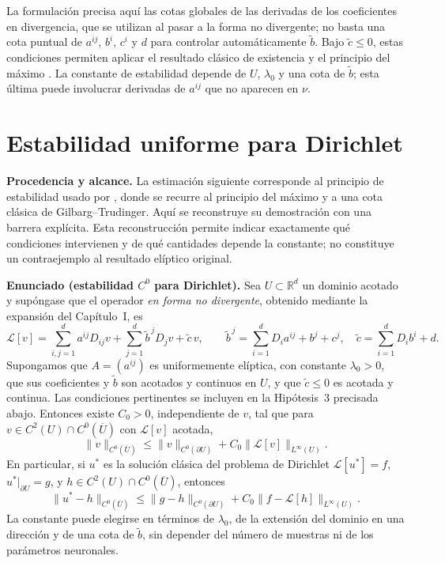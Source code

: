 \medskip
\noindent
La formulación precisa aquí las cotas globales de las derivadas de los
coeficientes en divergencia, que se utilizan al pasar a la forma no
divergente; no basta una cota puntual de $a^{ij}$, $b^i$, $c^i$ y $d$
para controlar automáticamente $\widetilde b$. Bajo $\widetilde c\le0$,
estas condiciones permiten aplicar el resultado clásico de existencia y
el principio del máximo \cite{gilbarg2001elliptic}. La constante de
estabilidad depende de $U$, $\lambda_0$ y una cota de $\widetilde b$;
esta última puede involucrar derivadas de $a^{ij}$ que no aparecen en $\nu$.

\section{Estabilidad uniforme para Dirichlet}
\label{sec:estabilidad_dirichlet}

\noindent\textbf{Procedencia y alcance.}
La estimación siguiente corresponde al principio de estabilidad usado por
\cite[Apéndice~D, Lema~D.1]{shin2020convergence}, donde se recurre al
principio del máximo y a una cota clásica de Gilbarg--Trudinger.
Aquí se reconstruye su demostración con una barrera explícita. Esta
reconstrucción permite indicar exactamente qué condiciones intervienen y de
qué cantidades depende la constante; no constituye un contraejemplo al
resultado elíptico original.

\medskip
\noindent\textbf{Enunciado (estabilidad $C^0$ para Dirichlet).}
Sea $U\subset\mathbb R^d$ un dominio acotado y supóngase que el operador
\emph{en forma no divergente}, obtenido mediante la expansión del Capítulo~I,
es
\[
\mathcal L[v]=\sum_{i,j=1}^d a^{ij}D_{ij}v+
\sum_{j=1}^d\widetilde b^{\,j}D_jv+\widetilde c\,v,
\qquad
\widetilde b^{\,j}=\sum_{i=1}^dD_i a^{ij}+b^j+c^j,
\quad
\widetilde c=\sum_{i=1}^dD_i b^i+d.
\]
Supongamos que $A=(a^{ij})$ es uniformemente elíptica, con constante
$\lambda_0>0$, que sus coeficientes y $\widetilde b$ son acotados y
continuos en $U$, y que $\widetilde c\leq 0$ es acotada y continua.
Las condiciones pertinentes se incluyen en la Hipótesis~3 precisada abajo.
Entonces existe $C_0>0$, independiente de $v$, tal que para
$v\in C^2(U)\cap C^0(\overline U)$ con $\mathcal L[v]$ acotada,
\begin{equation}\label{eq:estabilidad_error_general}
\|v\|_{C^0(\overline U)}
\leq \|v\|_{C^0(\partial U)}+
C_0\|\mathcal L[v]\|_{L^\infty(U)}.
\end{equation}
En particular, si $u^*$ es la solución clásica del problema de Dirichlet
$\mathcal L[u^*]=f$, $u^*|_{\partial U}=g$, y
$h\in C^2(U)\cap C^0(\overline U)$, entonces
\begin{equation}\label{eq:stability_C0}
\|u^*-h\|_{C^0(\overline U)}
\leq
\|g-h\|_{C^0(\partial U)}+
C_0\|f-\mathcal L[h]\|_{L^\infty(U)}.
\end{equation}
La constante puede elegirse en términos de $\lambda_0$, de la extensión
del dominio en una dirección y de una cota de $\widetilde b$, sin depender
del número de muestras ni de los parámetros neuronales.

